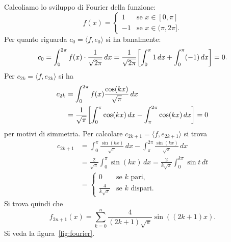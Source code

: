 \begin{example}
Calcoliamo lo sviluppo di Fourier della funzione:
\[
  f(x) = 
  \begin{cases}
    1 & \text{se $x\in [0,\pi]$}\\
    -1 & \text{se $x\in (\pi,2\pi]$}.
  \end{cases}
\]
Per quanto riguarda $c_0 = \langle f, e_0\rangle$ si ha
banalmente: 
\[
c_0 = \int_0^{2\pi} f(x) \cdot \frac{1}{\sqrt{2\pi}}\, dx 
  = \frac{1}{\sqrt{2\pi}}{\left[ \int_0^\pi 1 \, dx + \int_0^\pi (-1)\, dx \right]}
  = 0.  
\]
Per $c_{2k} = \langle f, e_{2k}\rangle$ si ha 
\begin{align*}
  c_{2k}
  &= \int_0^{2\pi} f(x)\frac{\cos (kx)}{\sqrt{\pi}}\, dx \\
  &= \frac{1}{\sqrt \pi} {\left[ \int_0^\pi \cos (kx)\, dx 
  - \int_{\pi}^{2\pi} \cos(kx)\, dx \right]}
  = 0 
\end{align*}
per motivi di simmetria.
Per calcolare $c_{2k+1}=\langle f, e_{2k+1}\rangle$ 
si trova 
\begin{align*}
  c_{2k+1}
  &= \int_0^\pi \frac{\sin(kx)}{\sqrt \pi}\, dx 
    - \int_\pi^{2\pi} \frac{\sin(kx)}{\sqrt \pi}\, dx \\
  &= \frac{2}{\sqrt \pi}\int_0^\pi \sin(kx)\, dx
  = \frac{2}{k\sqrt \pi}\int_0^{k\pi}\sin t\, dt\\
  &= 
  \begin{cases}
    0 & \text{se $k$ pari,}\\
    \frac{4}{k\sqrt \pi} & \text{se $k$ dispari.}
  \end{cases}
\end{align*}
Si trova quindi che   
\[
 f_{2n+1}(x)
 = \sum_{k=0}^n \frac{4}{(2k+1)\sqrt \pi}\sin((2k+1)x).
\]
Si veda la figura~\ref{fig:fourier}.
\end{example}

